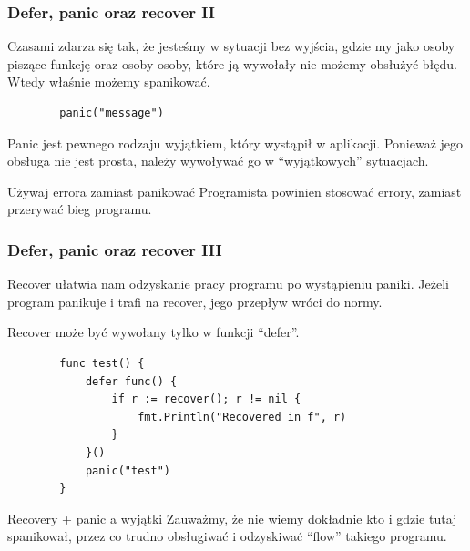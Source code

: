 \documentclass[10pt]{beamer}
\newcommand{\quotes}[1]{``#1''}
\begin{document}
\begin{frame}[fragile]
    \frametitle{Defer, panic oraz recover II}
    Czasami zdarza się tak, że jesteśmy w sytuacji bez wyjścia, gdzie my jako osoby piszące
    funkcję oraz osoby osoby, które ją wywołały nie możemy obsłużyć błędu. Wtedy
    właśnie możemy spanikować. 

    \begin{verbatim}
        panic("message")
    \end{verbatim}

    Panic jest pewnego rodzaju wyjątkiem, który wystąpił w aplikacji.
    Ponieważ jego obsługa nie jest prosta, należy wywoływać go w \quotes{wyjątkowych}
    sytuacjach.

    \begin{block}{Używaj errora zamiast panikować}
        Programista powinien stosować errory, zamiast przerywać bieg programu.
    \end{block}
\end{frame}

\begin{frame}[fragile]
    \frametitle{Defer, panic oraz recover III}
    Recover ułatwia nam odzyskanie pracy programu po wystąpieniu paniki.
    Jeżeli program panikuje i trafi na recover, jego przepływ wróci do normy.

    Recover może być wywołany tylko w funkcji \quotes{defer}.

    \begin{verbatim}
        func test() {
            defer func() {
                if r := recover(); r != nil {
                    fmt.Println("Recovered in f", r)
                }
            }()
            panic("test")
        }
    \end{verbatim}

    \begin{block}{Recovery + panic a wyjątki}
        Zauważmy, że nie wiemy dokładnie kto i gdzie tutaj spanikował, przez co trudno obsługiwać
        i odzyskiwać \quotes{flow} takiego programu.
    \end{block}
\end{frame}
\end{document}
